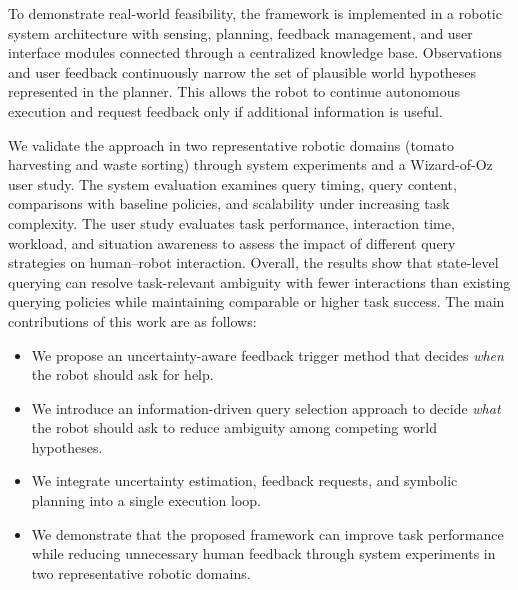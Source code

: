 To demonstrate real-world feasibility, the framework is implemented in a robotic system architecture with sensing, planning, feedback management, and user interface modules connected through a centralized knowledge base. Observations and user feedback continuously narrow the set of plausible world hypotheses represented in the planner. This allows the robot to continue autonomous execution and request feedback only if additional information is useful.


We validate the approach in two representative robotic domains (tomato harvesting and waste sorting) through system experiments and a Wizard-of-Oz user study. The system evaluation examines query timing, query content, comparisons with baseline policies, and scalability under increasing task complexity. The user study evaluates task performance, interaction time, workload, and situation awareness to assess the impact of different query strategies on human--robot interaction. Overall, the results show that state-level querying can resolve task-relevant ambiguity with fewer interactions than existing querying policies while maintaining comparable or higher task success.
The main contributions of this work are as follows:

\begin{itemize}

\item We propose an uncertainty-aware feedback trigger method that decides \textit{when} the robot should ask for help.

\item We introduce an information-driven query selection approach to decide \textit{what} the robot should ask to reduce ambiguity among competing world hypotheses.

\item We integrate uncertainty estimation, feedback requests, and symbolic planning into a single execution loop.

\item We demonstrate that the proposed framework can improve task performance while reducing unnecessary human feedback through system experiments in two representative robotic domains.
\end{itemize}
